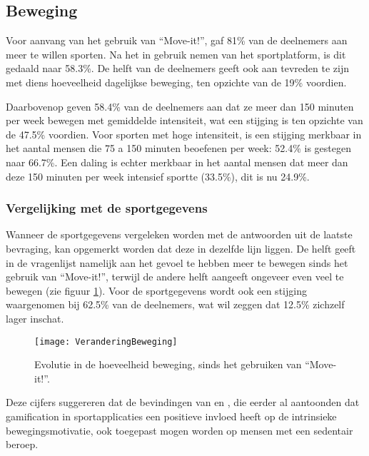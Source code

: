 \subsection{Beweging}

Voor aanvang van het gebruik van ``Move-it!'', gaf 81\% van de deelnemers aan meer te willen sporten. Na het in gebruik nemen van het sportplatform, is dit gedaald naar 58.3\%.
De helft van de deelnemers geeft ook aan tevreden te zijn met diens hoeveelheid dagelijkse beweging, ten opzichte van de 19\% voordien.

Daarbovenop geven 58.4\% van de deelnemers aan dat ze meer dan 150 minuten per week bewegen met gemiddelde intensiteit, wat een stijging is ten opzichte van de 47.5\% voordien. Voor sporten met hoge intensiteit, is een stijging merkbaar in het aantal mensen die 75 a 150 minuten beoefenen per week: 52.4\% is gestegen naar 66.7\%. Een daling is echter merkbaar in het aantal mensen dat meer dan deze 150 minuten per week intensief sportte (33.5\%), dit is nu 24.9\%.

\subsubsection{Vergelijking met de sportgegevens}

Wanneer de sportgegevens vergeleken worden met de antwoorden uit de laatste bevraging, kan opgemerkt worden dat deze in dezelfde lijn liggen. De helft geeft in de vragenlijst namelijk aan het gevoel te hebben meer te bewegen sinds het gebruik van ``Move-it!'', terwijl de andere helft aangeeft ongeveer even veel te bewegen (zie figuur \ref{fig:evolutie_beweging}). Voor de sportgegevens wordt ook een stijging waargenomen bij 62.5\% van de deelnemers, wat wil zeggen dat 12.5\% zichzelf lager inschat.

\begin{figure}[h]
    \caption[Evolutie in de hoeveelheid beweging, sinds het gebruiken van ``Move-it!'']{Evolutie in de hoeveelheid beweging, sinds het gebruiken van ``Move-it!''.}
    \texttt{[image: VeranderingBeweging]}
    \label{fig:evolutie_beweging}
\end{figure}

Deze cijfers suggereren dat de bevindingen van \textcite{Kari2016} en \textcite{Bitrian2020}, die eerder al aantoonden dat gamification in sportapplicaties een positieve invloed heeft op de intrinsieke bewegingsmotivatie, ook toegepast mogen worden op mensen met een sedentair beroep.

